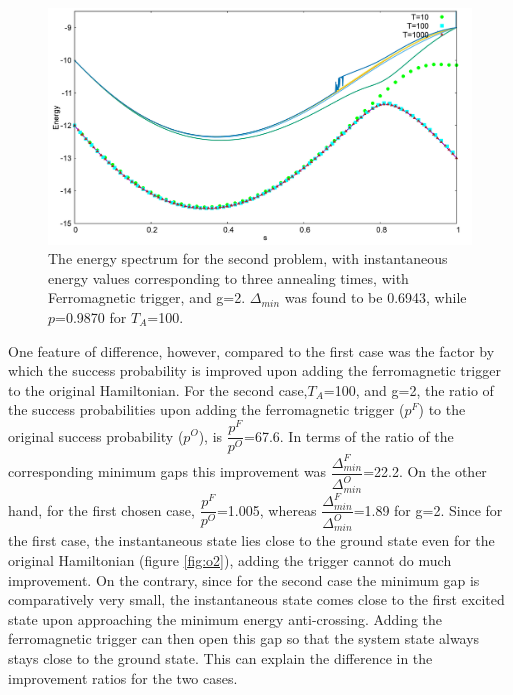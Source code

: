 \documentclass[12]{article}
\begin{document}
\begin{figure}[H]
\centering 
\includegraphics[scale=0.3]{950_s12_F_g2.png}
\caption{The energy spectrum for the second problem, with instantaneous energy values corresponding to three annealing times, with Ferromagnetic trigger, and g=2. $\Delta_{min}$ was found to be 0.6943, while $p$=0.9870 for $T_A$=100.}
\label{fig:f6}
\end{figure}


One feature of difference, however, compared to the first case was the factor by which the success probability is improved upon adding the ferromagnetic trigger to the original Hamiltonian. For the second case,$T_A$=100, and g=2, the ratio of the success probabilities upon adding the ferromagnetic trigger ($p^F$) to the original success probability ($p^O$), is $\dfrac{p^F}{p^O}$=67.6. In terms of the ratio of the corresponding minimum gaps this improvement was $\dfrac{\Delta_{min}^F}{\Delta_{min}^O}$=22.2. On the other hand, for the first chosen case, $\dfrac{p^F}{p^O}$=1.005, whereas $\dfrac{\Delta_{min}^F}{\Delta_{min}^O}$=1.89 for g=2. Since for the first case, the instantaneous state lies close to the ground state even for the original Hamiltonian (figure \ref{fig:o2}), adding the trigger cannot do much improvement. On the contrary, since for the second case the minimum gap is comparatively very small, the instantaneous state comes close to the first excited state upon approaching the minimum energy anti-crossing. Adding the ferromagnetic trigger can then open this gap so that the system state always stays close to the ground state. This can explain the difference in the improvement ratios for the two cases.
\end{document}
